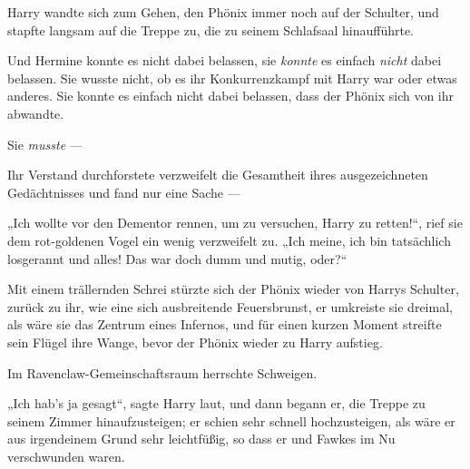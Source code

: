Harry wandte sich zum Gehen, den Phönix immer noch auf der Schulter, und stapfte langsam auf die Treppe zu, die zu seinem Schlafsaal hinaufführte.

Und Hermine konnte es nicht dabei belassen, sie \emph{konnte} es einfach \emph{nicht} dabei belassen. Sie wusste nicht, ob es ihr Konkurrenzkampf mit Harry war oder etwas anderes. Sie konnte es einfach nicht dabei belassen, dass der Phönix sich von ihr abwandte.

Sie \emph{musste} —

Ihr Verstand durchforstete verzweifelt die Gesamtheit ihres ausgezeichneten Gedächtnisses und fand nur eine Sache —

„Ich wollte vor den Dementor rennen, um zu versuchen, Harry zu retten!“, rief sie dem rot-goldenen Vogel ein wenig verzweifelt zu.
„Ich meine, ich bin tatsächlich losgerannt und alles! Das war doch dumm und mutig, oder?“

Mit einem trällernden Schrei stürzte sich der Phönix wieder von Harrys Schulter, zurück zu ihr, wie eine sich ausbreitende Feuersbrunst, er umkreiste sie dreimal, als wäre sie das Zentrum eines Infernos, und für einen kurzen Moment streifte sein Flügel ihre Wange, bevor der Phönix wieder zu Harry aufstieg.

Im Ravenclaw-Gemeinschaftsraum herrschte Schweigen.

„Ich hab’s ja gesagt“, sagte Harry laut, und dann begann er, die Treppe zu seinem Zimmer hinaufzusteigen; er schien sehr schnell hochzusteigen, als wäre er aus irgendeinem Grund sehr leichtfüßig, so dass er und Fawkes im Nu verschwunden waren.


